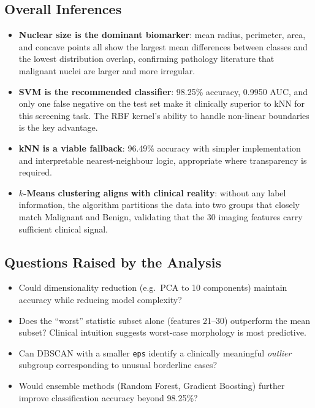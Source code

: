 \documentclass[12pt,a4paper]{article}
\begin{document}
\subsection{Overall Inferences}
\begin{itemize}[leftmargin=2em]
  \item \textbf{Nuclear size is the dominant biomarker}: mean radius, perimeter, area,
        and concave points all show the largest mean differences between classes and
        the lowest distribution overlap, confirming pathology literature that malignant
        nuclei are larger and more irregular.
  \item \textbf{SVM is the recommended classifier}: 98.25\% accuracy, 0.9950 AUC, and
        only one false negative on the test set make it clinically superior to kNN for
        this screening task.  The RBF kernel's ability to handle non-linear boundaries
        is the key advantage.
  \item \textbf{kNN is a viable fallback}: 96.49\% accuracy with simpler implementation
        and interpretable nearest-neighbour logic, appropriate where transparency is
        required.
  \item \textbf{$k$-Means clustering aligns with clinical reality}: without any label
        information, the algorithm partitions the data into two groups that closely
        match Malignant and Benign, validating that the 30 imaging features carry
        sufficient clinical signal.
\end{itemize}

\subsection{Questions Raised by the Analysis}
\begin{itemize}[leftmargin=2em]
  \item Could dimensionality reduction (e.g.\ PCA to 10 components) maintain
        accuracy while reducing model complexity?
  \item Does the ``worst'' statistic subset alone (features 21--30) outperform the
        mean subset?  Clinical intuition suggests worst-case morphology is most
        predictive.
  \item Can DBSCAN with a smaller \texttt{eps} identify a clinically meaningful
        \emph{outlier} subgroup corresponding to unusual borderline cases?
  \item Would ensemble methods (Random Forest, Gradient Boosting) further improve
        classification accuracy beyond 98.25\%?
\end{itemize}
\end{document}
